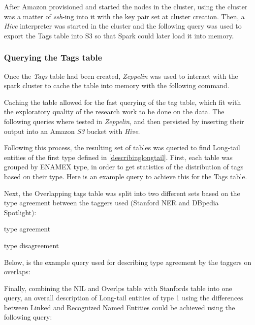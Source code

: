 After Amazon provisioned and started the nodes in the cluster, using the cluster was a matter of
\textit{ssh}-ing into it with the key pair set at cluster creation. 
Then, a \textit{Hive}\cite{hive} interpreter was started in the cluster and the following query was used to export the Tags table into S3
so that Spark could later load it into memory.


\subsubsection{Querying the Tags table}
Once the \textit{Tags} table had been created, \textit{Zeppelin}\cite{zeppelin} was used to interact with the spark cluster to cache the table into memory with the following command.


Caching the table allowed for the fast querying of the tag table, which fit with the exploratory quality of the research work to be done on the data.
The following queries where tested in \textit{Zeppelin}, and then persisted by inserting their output into an Amazon \textit{S3} bucket with \textit{Hive}.




Following this process, the resulting set of tables was queried to find Long-tail entities of the first type defined in \ref{describinglongtail}. 
First, each table was grouped by ENAMEX type, in order to get statistics of the distribution of tags based on their type.
Here is an example query to achieve this for the Tags table.

Next, the Overlapping tags table was split into two different sets based on the type agreement between the taggers used (Stanford NER and DBpedia Spotlight):
\begin{enumerate*}
  \item type agreement
  \item type disagreement
\end{enumerate*}
Below, is the example query used for describing type agreement by the taggers on overlaps:

Finally, combining the NIL and Overlps table with Stanfords table into one query, an overall description of Long-tail entities of type 1 using the differences
between Linked and Recognized Named Entities could be achieved using the following query:


